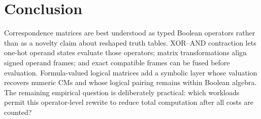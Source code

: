 \documentclass[11pt]{article}
\begin{document}
\section{Conclusion}
\label{sec:conclusion}

Correspondence matrices are best understood as typed Boolean operators rather
than as a novelty claim about reshaped truth tables. XOR--AND contraction lets
one-hot operand states evaluate those operators; matrix transformations align
signed operand frames; and exact compatible frames can be fused before
evaluation. Formula-valued logical matrices add a symbolic layer whose
valuation recovers numeric CMs and whose logical pairing remains within
Boolean algebra. The remaining empirical question is deliberately practical:
which workloads permit this operator-level rewrite to reduce total computation
after all costs are counted?





\end{document}
